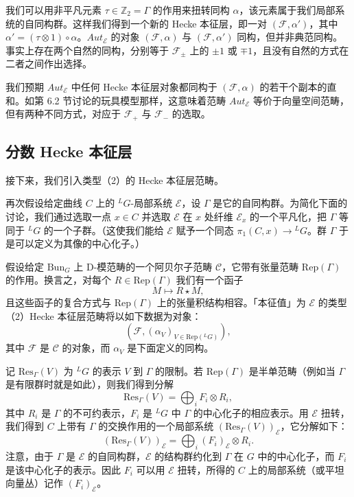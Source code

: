 \documentclass[11pt,a4paper]{article}
\newcommand{\Bun}{\mathrm{Bun}}
\begin{document}
我们可以用非平凡元素 $\tau\in\mathbb{Z}_2 = \Gamma$ 的作用来扭转同构 $\alpha$，该元素属于我们局部系统的自同构群。这样我们得到一个新的 Hecke 本征层，即一对 $(\mathcal{F},\alpha')$，其中 $\alpha' = (\tau\otimes1)\circ\alpha$。$Aut_{\mathcal{E}}$ 的对象 $(\mathcal{F},\alpha)$ 与 $(\mathcal{F},\alpha')$ 同构，但并非典范同构。事实上存在两个自然的同构，分别等于 $\mathcal{F}_\pm$ 上的 $\pm1$ 或 $\mp1$，且没有自然的方式在二者之间作出选择。

我们预期 $Aut_{\mathcal{E}}$ 中任何 Hecke 本征层对象都同构于 $(\mathcal{F},\alpha)$ 的若干个副本的直和。如第 6.2 节讨论的玩具模型那样，这意味着范畴 $Aut_{\mathcal{E}}$ 等价于向量空间范畴，但有两种不同方式，对应于 $\mathcal{F}_+$ 与 $\mathcal{F}_-$ 的选取。

\subsection{分数 Hecke 本征层}

接下来，我们引入类型（2）的 Hecke 本征层范畴。

再次假设给定曲线 $C$ 上的 ${}^LG$-局部系统 $\mathcal{E}$，设 $\Gamma$ 是它的自同构群。为简化下面的讨论，我们通过选取一点 $x\in C$ 并选取 $\mathcal{E}$ 在 $x$ 处纤维 $\mathcal{E}_x$ 的一个平凡化，把 $\Gamma$ 等同于 ${}^LG$ 的一个子群。（这使我们能给 $\mathcal{E}$ 赋予一个同态 $\pi_1(C,x)\to{}^LG$。群 $\Gamma$ 于是可以定义为其像的中心化子。）

假设给定 $\Bun_G$ 上 D-模范畴的一个阿贝尔子范畴 $\mathcal{C}$，它带有张量范畴 $\mathrm{Rep}(\Gamma)$ 的作用。换言之，对每个 $R\in\mathrm{Rep}(\Gamma)$ 我们有一个函子
\[
M\mapsto R\star M,
\]
且这些函子的复合方式与 $\mathrm{Rep}(\Gamma)$ 上的张量积结构相容。「本征值」为 $\mathcal{E}$ 的类型（2）Hecke 本征层范畴将以如下数据为对象：
\begin{equation}\tag{6.9}
(\mathcal{F},(\alpha_V)_{V\in\mathrm{Rep}({}^LG)}),
\end{equation}
其中 $\mathcal{F}$ 是 $\mathcal{C}$ 的对象，而 $\alpha_V$ 是下面定义的同构。

记 $\mathrm{Res}_\Gamma(V)$ 为 ${}^LG$ 的表示 $V$ 到 $\Gamma$ 的限制。若 $\mathrm{Rep}(\Gamma)$ 是半单范畴（例如当 $\Gamma$ 是有限群时就是如此），则我们得到分解
\[
\mathrm{Res}_\Gamma(V) = \bigoplus_i F_i\otimes R_i,
\]
其中 $R_i$ 是 $\Gamma$ 的不可约表示，$F_i$ 是 ${}^LG$ 中 $\Gamma$ 的中心化子的相应表示。用 $\mathcal{E}$ 扭转，我们得到 $C$ 上带有 $\Gamma$ 的交换作用的一个局部系统 $(\mathrm{Res}_\Gamma(V))_{\mathcal{E}}$，它分解如下：
\[
(\mathrm{Res}_\Gamma(V))_{\mathcal{E}} = \bigoplus_i (F_i)_{\mathcal{E}}\otimes R_i.
\]
注意，由于 $\Gamma$ 是 $\mathcal{E}$ 的自同构群，$\mathcal{E}$ 的结构群约化到 $\Gamma$ 在 $G$ 中的中心化子，而 $F_i$ 是该中心化子的表示。因此 $F_i$ 可以用 $\mathcal{E}$ 扭转，所得的 $C$ 上的局部系统（或平坦向量丛）记作 $(F_i)_{\mathcal{E}}$。
\end{document}
